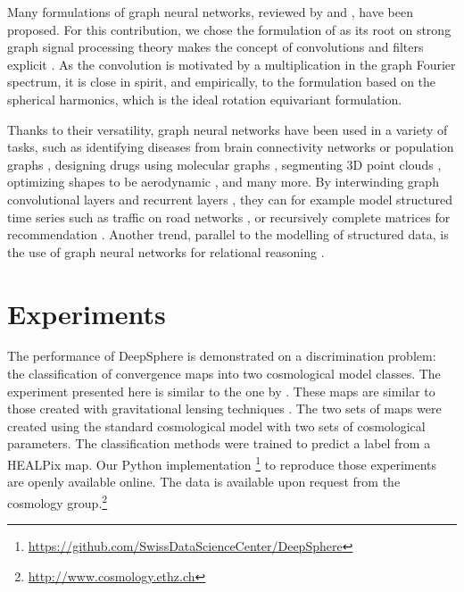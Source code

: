 \documentclass[final,twocolumn,3p,times,sort&compress]{elsarticle}
\newcommand{\1}{\b{1}}              %
\newcommand{\0}{\b{0}}              %
\begin{document}
Many formulations of graph neural networks, reviewed by \citep{bronstein2017review} and \citep{hamilton2017review}, have been proposed.
For this contribution, we chose the formulation of \citep{defferrard2016convolutional} as its root on strong graph signal processing theory makes the concept of convolutions and filters explicit \citep{shuman2013emerging}.
As the convolution is motivated by a multiplication in the graph Fourier spectrum, it is close in spirit, and empirically, to the formulation based on the spherical harmonics, which is the ideal rotation equivariant formulation.

Thanks to their versatility, graph neural networks have been used in a variety of tasks, such as identifying diseases from brain connectivity networks \citep{ktena2018metriclearning} or population graphs \citep{parisot2017disease}, designing drugs using molecular graphs \citep{hop2018drugdesign}, segmenting 3D point clouds \citep{qi2017pointcloudsegmentation}, optimizing shapes to be aerodynamic \citep{baque2018shape}, and many more.
By interwinding graph convolutional layers and recurrent layers \citep{seo2016gcrn}, they can for example model structured time series such as traffic on road networks \citep{li2018traffic}, or recursively complete matrices for recommendation \citep{monti2017recommendation}.
Another trend, parallel to the modelling of structured data, is the use of graph neural networks for relational reasoning \citep{battaglia2018review}.

\section{Experiments}
\label{sec:experiments}

The performance of DeepSphere is demonstrated on a discrimination problem: the classification of convergence maps into two cosmological model classes.
The experiment presented here is similar to the one by \citep{schmelze2017cosmologicalmodel}.
These maps are similar to those created with gravitational lensing techniques \citep{chang2017curvedsky}.
The two sets of maps were created using the standard cosmological model with two sets of cosmological parameters.
The classification methods were trained to predict a label from a HEALPix map.
Our Python implementation{ \footnote{\url{https://github.com/SwissDataScienceCenter/DeepSphere}}} to reproduce those experiments are openly available online.
The data is available upon request from the cosmology group.\footnote{\url{http://www.cosmology.ethz.ch}}
\end{document}
